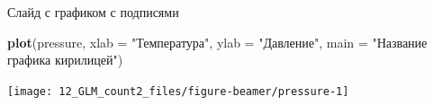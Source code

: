 \documentclass[ignorenonframetext,]{beamer}
\newenvironment{Shaded}{\begin{snugshade}}{\end{snugshade}}
\newcommand{\KeywordTok}[1]{\textcolor[rgb]{0.13,0.29,0.53}{\textbf{{#1}}}}
\newcommand{\DataTypeTok}[1]{\textcolor[rgb]{0.13,0.29,0.53}{{#1}}}
\newcommand{\StringTok}[1]{\textcolor[rgb]{0.31,0.60,0.02}{{#1}}}
\newcommand{\NormalTok}[1]{{#1}}
\begin{document}
\begin{frame}[fragile]{Слайд с графиком с подписями}

\begin{Shaded}
\begin{Highlighting}[]
\KeywordTok{plot}\NormalTok{(pressure, }
     \DataTypeTok{xlab =} \StringTok{"Температура"}\NormalTok{, }
     \DataTypeTok{ylab =} \StringTok{"Давление"}\NormalTok{, }
     \DataTypeTok{main =} \StringTok{"Название графика кирилицей"}\NormalTok{)}
\end{Highlighting}
\end{Shaded}

\texttt{[image: 12\_GLM\_count2\_files/figure-beamer/pressure-1]}

\end{frame}
\end{document}
